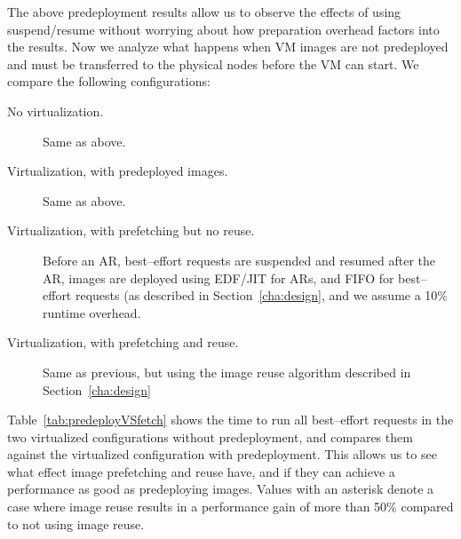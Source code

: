 The above predeployment results allow us to observe the effects of using suspend/resume without worrying about how preparation overhead factors into the results. Now we analyze what happens when VM images are not predeployed and must be transferred to the physical nodes before the VM can start. We compare the following configurations:

\begin{description}
\item[No virtualization.] Same as above.
\item[Virtualization, with predeployed images.] Same as above.
\item[Virtualization, with prefetching but no reuse.] Before an AR, best--effort requests are suspended and resumed after the AR, images are deployed using EDF/JIT for ARs, and FIFO for best--effort requests (as described in Section~\ref{cha:design}, and we assume a 10\% runtime overhead.
\item[Virtualization, with prefetching and reuse.] Same as previous, but using the image reuse algorithm described in Section~\ref{cha:design}
\end{description}

Table~\ref{tab:predeployVSfetch} shows the time to run all best--effort requests in the two virtualized configurations without predeployment, and compares them against the virtualized configuration with predeployment. This allows us to see what effect image prefetching and reuse have, and if they can achieve a performance as good as predeploying images. Values with an asterisk denote a case where image reuse results in a performance gain of more than 50\% compared to not using image reuse.

